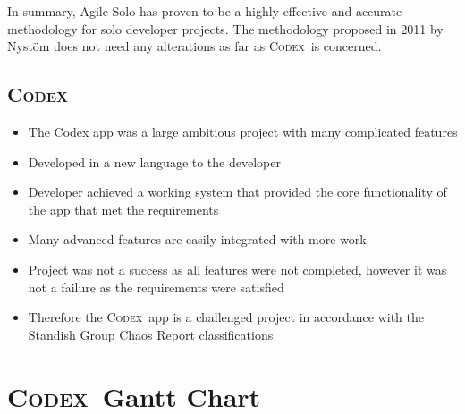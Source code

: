 \documentclass[final]{cmpreport}
\newcommand{\Codex}{\textsc{Codex}}
\begin{document}
		In summary, Agile Solo has proven to be a highly effective and accurate methodology for solo developer projects. The methodology proposed in 2011 by Nyst{\"o}m does not need any alterations as far as \Codex \ is concerned.  
		
		\subsection{\Codex} \label{sec:codex-conc}
		\begin{itemize}
			\item The Codex app was a large ambitious project with many complicated features
			\item Developed in a new language to the developer
			\item Developer achieved a working system that provided the core functionality of the app that met the requirements
			\item Many advanced features are easily integrated with more work
			\item Project was not a success as all features were not completed, however it was not a failure as the requirements were satisfied
			\item Therefore the \Codex \ app is a challenged project in accordance with the Standish Group Chaos Report classifications
		\end{itemize}
	
	\clearpage
	\appendix
	
	\section{\Codex \ Gantt Chart} \label{app:gantt}
	
\end{document}
